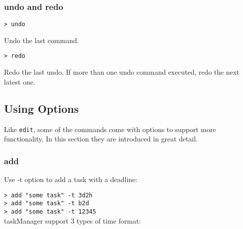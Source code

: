 \documentclass[12pt, a4paper]{article}
\begin{document}
\subsubsection{undo and redo}
\texttt{\textgreater \ undo \footnotemark}

Undo the last command. 


\texttt{\textgreater \ redo}

Redo the last undo. If more than one undo command executed, redo the next latest one.

\subsection{Using Options}

Like \texttt{edit}, some of the commands come with options to support more functionality.
In this section they are introduced in great detail.

\subsubsection{add}

\noindent Use -t option to add a task with a deadline:

\noindent \texttt{\textgreater \ add "some task" -t 3d2h\\
\textgreater \ add "some task" -t b2d\\
\textgreater \ add "some task" -t 12345}\\

taskManager support 3 types of time format:
\end{document}
